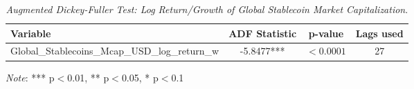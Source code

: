 \begin{table}[h]
  \centering
  \caption{\textit{Augmented Dickey-Fuller Test: Log Return/Growth of Global Stablecoin Market Capitalization}.}
  \label{tab:adfstablecoinafterwins20182025}
  \begin{tabular}{lccc}
    \toprule
    \textbf{Variable} & \textbf{ADF Statistic} & \textbf{p-value} & \textbf{Lags used} \\ 
    \midrule
    Global\_Stablecoins\_Mcap\_USD\_log\_return\_w & -5.8477*** & $< 0.0001$ & 27 \\ 
    \bottomrule
  \end{tabular}
  \vspace{2pt}
  \footnotesize{\textit{Note}: *** p$<$0.01, ** p$<$0.05, * p$<$0.1}\\
\end{table}